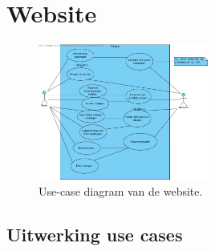 \section{Website}

\begin{figure}[h!]
	\centering
		\includegraphics[width=0.5\textwidth]{images/analyse/ucd_website}
	\caption{Use-case diagram van de website.}
\end{figure}

\subsection{Uitwerking use cases}

